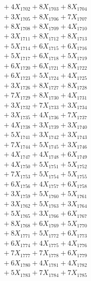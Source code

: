 \documentclass[a4paper,10pt]{article}
\begin{document}
{\begin{align}
&\;  + 4 X_{1702} + 8 X_{1703} + 8 X_{1704} \\[0.3ex]
&\;  + 3 X_{1705} + 8 X_{1706} + 7 X_{1707} \\[0.3ex]
&\;  + 8 X_{1708} + 8 X_{1709} + 4 X_{1710} \\[0.3ex]
&\;  + 3 X_{1711} + 8 X_{1712} + 8 X_{1713} \\[0.3ex]
&\;  + 5 X_{1714} + 6 X_{1715} + 6 X_{1716} \\[0.3ex]
&\;  + 5 X_{1717} + 6 X_{1718} + 5 X_{1719} \\[0.5ex]\allowbreak
&\;  + 6 X_{1720} + 6 X_{1721} + 8 X_{1722} \\[0.3ex]
&\;  + 6 X_{1723} + 5 X_{1724} + 4 X_{1725} \\[0.3ex]
&\;  + 3 X_{1726} + 8 X_{1727} + 8 X_{1728} \\[0.3ex]
&\;  + 7 X_{1729} + 8 X_{1730} + 4 X_{1731} \\[0.3ex]
&\;  + 3 X_{1732} + 7 X_{1733} + 3 X_{1734} \\[0.3ex]
&\;  + 3 X_{1735} + 4 X_{1736} + 7 X_{1737} \\[0.3ex]
&\;  + 4 X_{1738} + 3 X_{1739} + 3 X_{1740} \\[0.3ex]
&\;  + 5 X_{1741} + 3 X_{1742} + 3 X_{1743} \\[0.3ex]
&\;  + 7 X_{1744} + 5 X_{1745} + 3 X_{1746} \\[0.3ex]
&\;  + 4 X_{1747} + 4 X_{1748} + 6 X_{1749} \\[0.5ex]\allowbreak
&\;  + 4 X_{1750} + 5 X_{1751} + 5 X_{1752} \\[0.3ex]
&\;  + 7 X_{1753} + 5 X_{1754} + 5 X_{1755} \\[0.3ex]
&\;  + 6 X_{1756} + 4 X_{1757} + 6 X_{1758} \\[0.3ex]
&\;  + 3 X_{1759} + 5 X_{1760} + 5 X_{1761} \\[0.3ex]
&\;  + 3 X_{1762} + 5 X_{1763} + 3 X_{1764} \\[0.3ex]
&\;  + 5 X_{1765} + 3 X_{1766} + 6 X_{1767} \\[0.3ex]
&\;  + 8 X_{1768} + 6 X_{1769} + 5 X_{1770} \\[0.3ex]
&\;  + 8 X_{1771} + 5 X_{1772} + 6 X_{1773} \\[0.3ex]
&\;  + 6 X_{1774} + 4 X_{1775} + 4 X_{1776} \\[0.3ex]
&\;  + 7 X_{1777} + 7 X_{1778} + 6 X_{1779} \\[0.5ex]\allowbreak
&\;  + 6 X_{1780} + 4 X_{1781} + 4 X_{1782} \\[0.3ex]
&\;  + 5 X_{1783} + 7 X_{1784} + 7 X_{1785} \\[0.3ex]

\end{align}}
\end{document}
